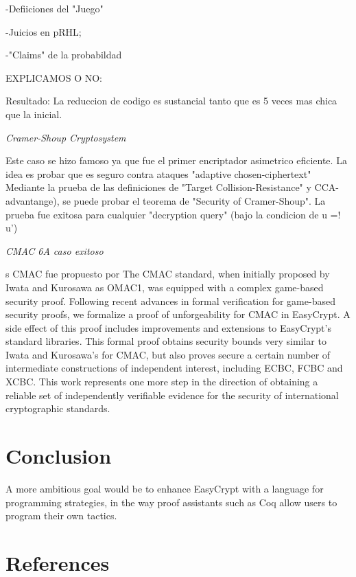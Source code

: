 \documentclass[runningheads,a4paper]{llncs}
\begin{document}
-Defiiciones del "Juego"

-Juicios en pRHL;

-"Claims" de la probabildad

EXPLICAMOS O NO:

Resultado: La reduccion de codigo es sustancial tanto que es 5 veces mas chica que la inicial.\cite{article5}



\centerline{\emph{Cramer-Shoup Cryptosystem}}

Este caso se hizo famoso ya que fue el primer encriptador asimetrico eficiente. La idea es probar que es seguro contra ataques "adaptive chosen-ciphertext"
Mediante la prueba de las definiciones de "Target Collision-Resistance" y CCA-advantange), se puede probar el teorema de "Security of Cramer-Shoup".
La prueba fue exitosa para cualquier "decryption query" (bajo la condicion de u =! u')\cite{article5}



\centerline{\emph{CMAC 6A caso exitoso}}
\cite{article7}
s
CMAC fue propuesto por 
The CMAC standard, when initially proposed by
Iwata and Kurosawa as OMAC1, was equipped with a complex
game-based security proof. Following recent advances in formal
verification for game-based security proofs, we formalize a proof
of unforgeability for CMAC in EasyCrypt. A side effect of
this proof includes improvements and extensions to EasyCrypt’s
standard libraries. This formal proof obtains security bounds
very similar to Iwata and Kurosawa’s for CMAC, but also
proves secure a certain number of intermediate constructions of
independent interest, including ECBC, FCBC and XCBC. This
work represents one more step in the direction of obtaining a
reliable set of independently verifiable evidence for the security
of international cryptographic standards.



\section{Conclusion}

A more ambitious goal
would be to enhance EasyCrypt with a language for programming strategies, in
the way proof assistants such as Coq allow users to program their own tactics.

\section{References}
\end{document}
